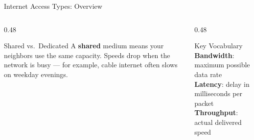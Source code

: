 \documentclass[aspectratio=169]{beamer}  %
\begin{document}
\begin{frame}[t]{Internet Access Types: Overview}
\begin{columns}[T]
\begin{column}{0.48\textwidth}
\begin{alertblock}{Shared vs.\ Dedicated}
                A \textbf{shared} medium means your neighbors use the same capacity. Speeds drop when the network is busy --- for example, cable internet often slows on weekday evenings.
            \end{alertblock}
        \end{column}
        \begin{column}{0.48\textwidth}
            \begin{block}{Key Vocabulary}
                \footnotesize
                \textbf{Bandwidth}: maximum possible data rate \\
                \textbf{Latency}: delay in milliseconds per packet \\
                \textbf{Throughput}: actual delivered speed
            \end{block}
        \end{column}
    \end{columns}
\end{frame}
\end{document}
